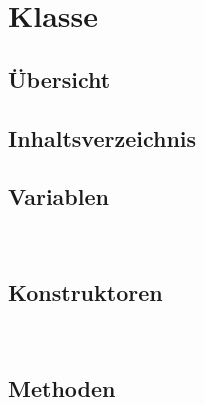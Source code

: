 
\section[FrameworkSerializator]{Klasse }\label{ontologyFramework.OFErrorManagement.OFGUI.allInstancesGUI.FrameworkSerializator-class}
\subsection{Übersicht}

\subsection{Inhaltsverzeichnis}
\subsection{Variablen}
\begin{description}
\item[{\label{ontologyFramework.OFErrorManagement.OFGUI.allInstancesGUI.FrameworkSerializator.stop}}]
~ 
\end{description}
\subsection{Konstruktoren}
\begin{description}
\item[{\label{ontologyFramework.OFErrorManagement.OFGUI.allInstancesGUI.FrameworkSerializator()}}]
~ 
\end{description}
\subsection{Methoden}
\begin{description}
\item[{\label{ontologyFramework.OFErrorManagement.OFGUI.allInstancesGUI.FrameworkSerializator.stopRun()}}]
~ 
\item[{\label{ontologyFramework.OFErrorManagement.OFGUI.allInstancesGUI.FrameworkSerializator.run()}}]
~ 
\end{description}
